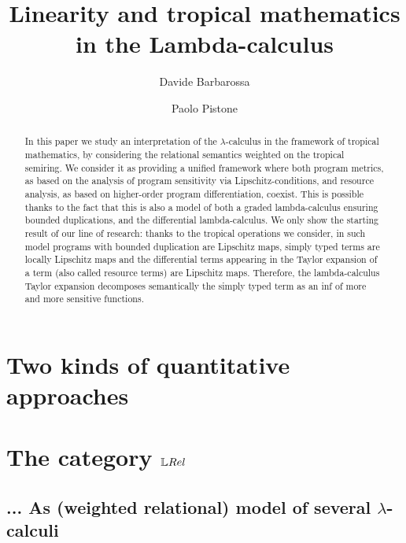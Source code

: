 \documentclass[a4paper,UKenglish,cleveref, autoref, thm-restate]{lipics-v2021}
\title{Linearity and tropical mathematics in the Lambda-calculus} %
\author{Davide {Barbarossa}}{Dipartimento di Informatica, Universit\`a di Bologna, %
Italy%
\and \url{https://lipn.univ-paris13.fr/\~barbarossa/index.html} }{davide.barbarossa@unibo.it}{https://orcid.org/0000-0003-4608-8282}{%
}%
\author{Paolo {Pistone}}{Dipartimento di Informatica, Universit\`a di Bologna, %
Italy%
\and \url{%
} }{paolo.pistone2@unibo.it}{%
}{%
}
\begin{document}
\maketitle

\begin{abstract}
In this paper we study an interpretation of the $\lambda$-calculus in the framework of tropical mathematics, by considering the relational semantics weighted on the tropical semiring.
We consider it as providing a unified framework where both program metrics, as based on the analysis of program sensitivity via Lipschitz-conditions, and resource analysis, as based on higher-order program differentiation, coexist. This is possible thanks to the fact that this is also a model of both a graded lambda-calculus ensuring bounded duplications, and the differential lambda-calculus. We only show the starting result of our line of research: thanks to the tropical operations we consider, in such model programs with bounded duplication are Lipschitz maps, simply typed terms are locally Lipschitz maps and the differential terms appearing in the Taylor expansion of a term (also called resource terms) are Lipschitz maps. Therefore, the lambda-calculus Taylor expansion decomposes semantically the simply typed term as an inf of more and more sensitive functions.
\end{abstract}

\section{Two kinds of quantitative approaches}



%


\section{The category $\LREL$}\label{section3}



\subsection{... As (weighted relational) model of several $\lambda$-calculi}
\end{document}
